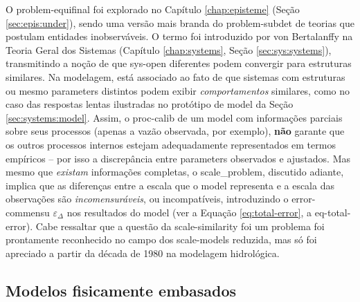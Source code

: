 \documentclass[./main.tex]{subfiles}
\begin{document}
\par O \gls{problem-equifinal} foi explorado no Capítulo \ref{chap:episteme} (Seção \ref{sec:epis:under}), sendo uma versão mais branda do \gls{problem-subdet} de teorias que postulam entidades inobserváveis. O termo  foi introduzido por von Bertalanffy na Teoria Geral dos Sistemas (Capítulo \ref{chap:systems}, Seção \ref{sec:sys:systems}), transmitindo a noção de que \gls{sys-open} diferentes podem convergir para estruturas similares. Na modelagem, está associado ao fato de que sistemas com estruturas ou mesmo \gls{parameters} distintos podem exibir \textit{comportamentos} similares, como no caso das respostas lentas ilustradas no protótipo de \gls{model} da Seção \ref{sec:systems:model}. Assim, o \gls{proc-calib} de um \gls{model} com informações parciais sobre seus processos (apenas a vazão observada, por exemplo), \textbf{não} garante que os outros processos internos estejam adequadamente representados em termos empíricos -- por isso a discrepância entre \gls{parameters} observados e ajustados. Mas mesmo que \textit{existam} informações completas, o \gls{scale_problem}, discutido adiante, implica que as diferenças entre a escala que o \gls{model} representa e a escala das observações são \textit{incomensuráveis}, ou incompatíveis, introduzindo o \gls{error-commensu} $\varepsilon_{\Delta}$ nos resultados do \gls{model} (ver a Equação \eqref{eq:total-error}, a \gls{eq-total-error}). Cabe ressaltar que a questão da \gls{scale-similarity} foi um problema foi prontamente reconhecido no campo dos \gls{scale-models} reduzida, mas só foi apreciado a partir da década de 1980 na modelagem hidrológica.

\subsection{Modelos fisicamente embasados} \label{sec:hydro:physical}
\end{document}
